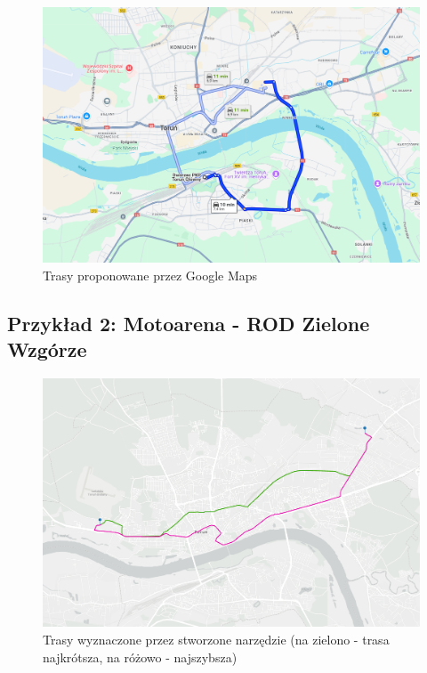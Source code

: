\documentclass{article}
\begin{document}
\begin{figure}[H]
    \centering
    \includegraphics[width=1\textwidth]{img/glowny-copernicus-google.png}
    \caption{Trasy proponowane przez Google Maps}
\end{figure}

\subsection{Przykład 2: Motoarena - ROD Zielone Wzgórze}
\begin{figure}[H]
    \centering
    \includegraphics[width=1\textwidth]{img/motoarena-rod.png}
    \caption{Trasy wyznaczone przez stworzone narzędzie (na zielono - trasa najkrótsza, na różowo - najszybsza)}
\end{figure}
\end{document}
